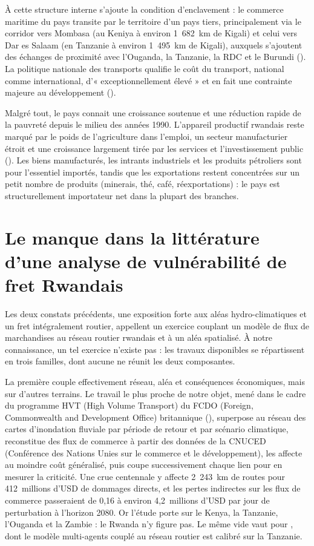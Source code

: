 \documentclass[12pt,a4paper,french]{report}
\begin{document}
	À cette structure interne s'ajoute la condition d'enclavement : le commerce maritime du pays transite par le territoire d'un pays tiers, principalement via le corridor vers Mombasa (au Keniya à environ 1~682~km de Kigali) et celui vers Dar es Salaam (en Tanzanie à environ 1~495~km de Kigali), auxquels s'ajoutent des échanges de proximité avec l'Ouganda, la Tanzanie, la RDC et le Burundi (\cite{NCTTCA2018, MININFRA2021}). La politique nationale des transports qualifie le coût du transport, national comme international, d'« exceptionnellement élevé » et en fait une contrainte majeure au développement (\cite{MININFRA2021}). 

	Malgré tout, le pays connait une croissance soutenue et une réduction rapide de la pauvreté depuis le milieu des années 1990. L'appareil productif rwandais reste marqué par le poids de l'agriculture dans l'emploi, un secteur manufacturier étroit et une croissance largement tirée par les services et l'investissement public (\cite{WorldBank2020, WorldBank2024CEM}). Les biens manufacturés, les intrants industriels et les produits pétroliers sont pour l'essentiel importés, tandis que les exportations restent concentrées sur un petit nombre de produits (minerais, thé, café, réexportations) : le pays est structurellement importateur net dans la plupart des branches.
	
	\section{Le manque dans la littérature d'une analyse de vulnérabilité de fret Rwandais}
	\label{sec:manque_litterature}

	Les deux constats précédents, une exposition forte aux aléas hydro-climatiques et un fret intégralement routier, appellent un exercice couplant un modèle de flux de marchandises au réseau routier rwandais et à un aléa spatialisé. À notre connaissance, un tel exercice n'existe pas : les travaux disponibles se répartissent en trois familles, dont aucune ne réunit les deux composantes.

	La première couple effectivement réseau, aléa et conséquences économiques, mais sur d'autres terrains. Le travail le plus proche de notre objet, mené dans le cadre du programme HVT (High Volume Transport) du FCDO (Foreign, Commonwealth and Development Office) britannique (\cite{Hickford2023}), superpose au réseau des cartes d'inondation fluviale par période de retour et par scénario climatique, reconstitue des flux de commerce à partir des données de la CNUCED (Conférence des Nations Unies sur le commerce et le développement), les affecte au moindre coût généralisé, puis coupe successivement chaque lien pour en mesurer la criticité. Une crue centennale y affecte 2~243~km de routes pour 412~millions d'USD de dommages directs, et les pertes indirectes sur les flux de commerce passeraient de 0,16 à environ 4,2~millions d'USD par jour de perturbation à l'horizon 2080. Or l'étude porte sur le Kenya, la Tanzanie, l'Ouganda et la Zambie : le Rwanda n'y figure pas. Le même vide vaut pour \cite{Colon2021}, dont le modèle multi-agents couplé au réseau routier est calibré sur la Tanzanie.
\end{document}

